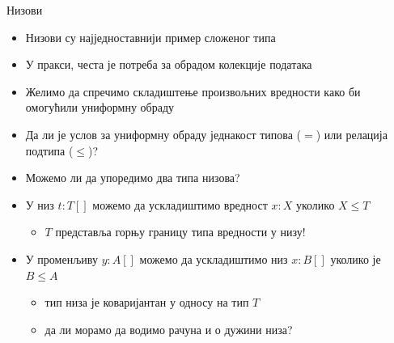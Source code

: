 \documentclass[xcolor=table]{beamer}
\begin{document}
    \begin{frame}[allowframebreaks]{Низови}
        \begin{itemize}
            \item Низови су најједноставнији пример сложеног типа
            \item У пракси, честа је потреба за обрадом колекције података
            \item Желимо да спречимо складиштење произвољних вредности како би омогућили униформну обраду
            \item Да ли је услов за униформну обраду једнакост типова (\begin{math}=\end{math}) или релација подтипа (\begin{math}\leq\end{math})?
            \item Можемо ли да упоредимо два типа низова?
        \end{itemize}

        \framebreak

        \begin{itemize}
            \item У низ \begin{math}t: T[]\end{math} можемо да ускладиштимо вредност \begin{math}x: X\end{math} уколико \begin{math}X \leq T\end{math}
            \begin{itemize}
                \item \begin{math}T\end{math} представља горњу границу типа вредности у низу!
            \end{itemize}
            \item У променљиву \begin{math}y: A[]\end{math} можемо да ускладиштимо низ \begin{math}x: B[]\end{math} уколико је \begin{math}B \leq A\end{math}
            \begin{itemize}
                \item тип низа је коваријантан у односу на тип \begin{math}T\end{math}
                \item да ли морамо да водимо рачуна и о дужини низа?
            \end{itemize}
        \end{itemize}
    \end{frame}
\end{document}
